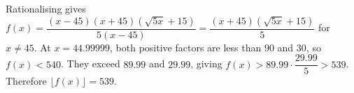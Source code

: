 Rationalising gives $f(x)=\dfrac{(x-45)(x+45)(\sqrt{5x}+15)}{5(x-45)}=\dfrac{(x+45)(\sqrt{5x}+15)}{5}$ for $x\ne45$. At $x=44.99999$, both positive factors are less than $90$ and $30$, so $f(x)<540$. They exceed $89.99$ and $29.99$, giving $f (x) > 89.99 \cdot \dfrac{29.99}{5} > 539$. Therefore $\boxed{\lfloor f(x)\rfloor=539}$.
